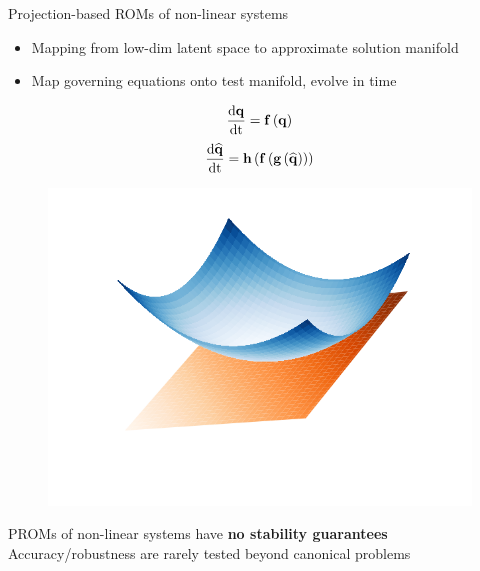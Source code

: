 \documentclass[]{beamer}
\begin{document}
\begin{frame}{Projection-based ROMs of non-linear systems}
    \begin{itemize}
        \item Mapping from low-dim latent space to approximate solution manifold
        \item Map governing equations onto test manifold, evolve in time
    \end{itemize}
	\centering
	\begin{minipage}{0.49\linewidth}
		\centering
		\vspace{-2em}
		\begin{equation*}
			\frac{\text{d} \mathbf{q}}{\text{d} \text{t}} = \mathbf{f} \left(\mathbf{q}\right)
		\end{equation*}
		\begin{equation*}
			\frac{\text{d} \mathbf{\widehat{q}}}{\text{d} \text{t}} = \mathbf{h}\left(\mathbf{f} \left(\mathbf{g}\left(\mathbf{\widehat{q}}\right)\right)\right)
		\end{equation*}
	\end{minipage}
	\hspace{-2em}
	\begin{minipage}{0.49\linewidth}
		\begin{figure}
			\includegraphics[width=0.99\linewidth,trim={2em 2em 2em 2em},clip]{theory/tangentPlane.png}
		\end{figure}
	\end{minipage}
	\begin{tcolorbox}[colframe=red!50!white,halign=center]
		PROMs of non-linear systems have \textbf{no stability guarantees} \\
		Accuracy/robustness are rarely tested beyond canonical problems
	\end{tcolorbox}
\end{frame}
\end{document}
